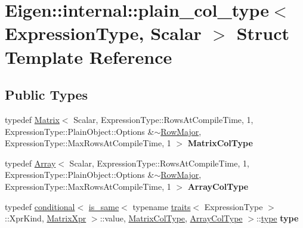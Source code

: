 \hypertarget{struct_eigen_1_1internal_1_1plain__col__type}{}\section{Eigen\+:\+:internal\+:\+:plain\+\_\+col\+\_\+type$<$ Expression\+Type, Scalar $>$ Struct Template Reference}
\label{struct_eigen_1_1internal_1_1plain__col__type}
\subsection*{Public Types}
\begin{DoxyCompactItemize}
\item 
\mbox{\label{struct_eigen_1_1internal_1_1plain__col__type_ac75ab0cd71ee5bed5adbd9b77eeba12a}} 
typedef \hyperlink{group___core___module_class_eigen_1_1_matrix}{Matrix}$<$ Scalar, Expression\+Type\+::\+Rows\+At\+Compile\+Time, 1, Expression\+Type\+::\+Plain\+Object\+::\+Options \&$\sim$\hyperlink{group__enums_ggaacded1a18ae58b0f554751f6cdf9eb13acfcde9cd8677c5f7caf6bd603666aae3}{Row\+Major}, Expression\+Type\+::\+Max\+Rows\+At\+Compile\+Time, 1 $>$ {\bfseries Matrix\+Col\+Type}
\item 
\mbox{\label{struct_eigen_1_1internal_1_1plain__col__type_a17712acb2f07a712205370a99a62f402}} 
typedef \hyperlink{group___core___module_class_eigen_1_1_array}{Array}$<$ Scalar, Expression\+Type\+::\+Rows\+At\+Compile\+Time, 1, Expression\+Type\+::\+Plain\+Object\+::\+Options \&$\sim$\hyperlink{group__enums_ggaacded1a18ae58b0f554751f6cdf9eb13acfcde9cd8677c5f7caf6bd603666aae3}{Row\+Major}, Expression\+Type\+::\+Max\+Rows\+At\+Compile\+Time, 1 $>$ {\bfseries Array\+Col\+Type}
\item 
\mbox{\label{struct_eigen_1_1internal_1_1plain__col__type_a0084ea2ac7f2803ac1c1c13e968e6b04}} 
typedef \hyperlink{struct_eigen_1_1internal_1_1conditional}{conditional}$<$ \hyperlink{struct_eigen_1_1internal_1_1is__same}{is\+\_\+same}$<$ typename \hyperlink{struct_eigen_1_1internal_1_1traits}{traits}$<$ Expression\+Type $>$\+::Xpr\+Kind, \hyperlink{struct_eigen_1_1_matrix_xpr}{Matrix\+Xpr} $>$\+::value, \hyperlink{group___core___module_class_eigen_1_1_matrix}{Matrix\+Col\+Type}, \hyperlink{group___core___module_class_eigen_1_1_array}{Array\+Col\+Type} $>$\+::\hyperlink{class_eigen_1_1internal_1_1_tensor_lazy_evaluator_writable}{type} {\bfseries type}

\end{DoxyCompactItemize}
